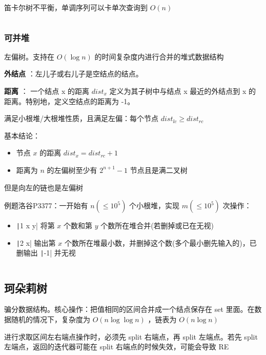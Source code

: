 \documentclass[twocolumn,10pt]{ctexart}
\begin{document}
笛卡尔树不平衡，单调序列可以卡单次查询到 $O(n)$

\inputminted{cpp}{code/p5854_cartesian_tree.cpp}

\subsubsection{可并堆}

左偏树。支持在 $O(\log n)$ 的时间复杂度内进行合并的堆式数据结构

\textbf{外结点} ：左儿子或右儿子是空结点的结点。

\textbf{距离} ： 一个结点 x 的距离 $dist_x$ 定义为其子树中与结点 x 最近的外结点到 x 的距离。特别地，定义空结点的距离为 -1。

满足小根堆/大根堆性质，且满足左偏：每个节点 $dist_{lc}\ge dist_{rc}$

基本结论：

\begin{itemize}
\item 节点 $x$ 的距离 $dist_x=dist_{rc}+1$
\item 距离为 $n$ 的左偏树至少有 $2^{n+1}-1$ 节点且是满二叉树
\end{itemize}

\begin{notebox}
但是向左的链也是左偏树

例题洛谷P3377：一开始有 $n(\le10^5)$ 个小根堆，实现 $m(\le10^5)$ 次操作：

\begin{itemize}
\item \texttt|1 x y| 将第 $x$ 个数和第 $y$ 个数所在堆合并(若删掉或已在无视)
\item \texttt|2 x| 输出第 $x$ 个数所在堆最小数，并删掉这个数(多个最小删先输入的)，已删输出 \texttt|-1| 并无视
\end{itemize}
\end{notebox}

\inputminted{cpp}{code/p3377_leftist_tree.cpp}

\subsection{珂朵莉树}

骗分数据结构。核心操作：把值相同的区间合并成一个结点保存在 set 里面。在数据随机的情况下，复杂度为 $O(n\log\log n)$ ，链表为 $O(n\log n)$

进行求取区间左右端点操作时，必须先 split 右端点，再 split 左端点。若先 split 左端点，返回的迭代器可能在 split 右端点的时候失效，可能会导致 RE
\end{document}
